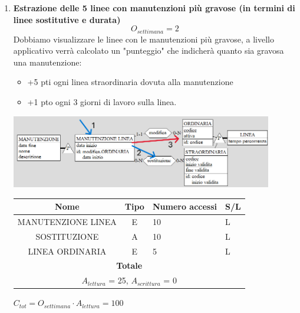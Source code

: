 \documentclass[12pt,a4paper]{report}
\begin{document}
\begin{enumerate}[label=\textbf{\arabic*)}]

	\item \textbf{Estrazione delle 5 linee con manutenzioni più gravose (in termini di linee sostitutive e durata)} \label{op12} \\
	    \[ {O_{settimana} = 2} \]
	    Dobbiamo visualizzare le linee con le manutenzioni più gravose, a livello applicativo verrà calcolato un "punteggio" che indicherà quanto sia gravosa una manutenzione:
	    \begin{itemize}
		\renewcommand\labelitemi{--}
	        \item +5 pti ogni linea straordinaria dovuta alla manutenzione
	        \item +1 pto ogni 3 giorni di lavoro sulla  linea.
	    \end{itemize}
        \begin{center}
	    \includegraphics[width=0.9\textwidth]{op_12}
	    \end{center}
	    \begin{table}[H]
	    \centering
	    \begin{tabular}{|c|c|l|l|}
	    \hline
	    \textbf{Nome} & \textbf{Tipo} & \textbf{Numero accessi} & \textbf{S/L} \\
	    \hline
	    MANUTENZIONE LINEA & E & 10 & L \\
	    \hline
	    SOSTITUZIONE & A & 10 & L \\
	    \hline
	    LINEA ORDINARIA & E & 5 & L \\
	    \hline
	    \multicolumn{4}{c}{\textbf{Totale}} \\
	    \multicolumn{4}{c}{${A_{lettura}}$ = 25, ${A_{scrittura}}$ = 0} \\
	    \hline
	    \end{tabular}
	    \end{table}
	    \begin{center}
	    ${C_{tot} = {O_{settimana}}\cdot {A_{lettura}} = 100}$
	    \end{center}


\end{enumerate}
\end{document}
